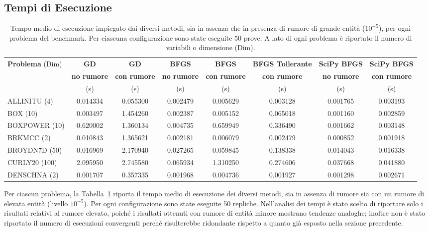 \subsection{Tempi di Esecuzione}
\begin{table}
    \scriptsize
    \caption{Tempo medio di esecuzione impiegato dai diversi metodi, sia in assenza che in presenza di rumore di grande entità (\(10^{-5}\)), per ogni problema del benchmark. Per ciascuna configurazione sono state eseguite 50 prove. A lato di ogni problema è riportato il numero di variabili o dimensione (Dim).}\label{tab:tempi_rumore_grande}
    \centering
    \begin{tabular}{lccccccc}
    \toprule
    \multirow{2}{*}{\textbf{Problema} (Dim)} & \textbf{GD} & \textbf{GD} & \textbf{BFGS} & \textbf{BFGS} & \textbf{BFGS Tollerante} & \textbf{SciPy BFGS} & \textbf{SciPy BFGS} \\
                                       & \textbf{no rumore} & \textbf{con rumore} & \textbf{no rumore} & \textbf{con rumore} & \textbf{con rumore} & \textbf{no rumore} & \textbf{con rumore} \\
                                       & (s) & (s) & (s) & (s) & (s) & (s) & (s) \\
    \midrule
    ALLINITU (4)  & 0.014334 & 0.055300 & 0.002479 & 0.005629 & 0.003128 & 0.001765 & 0.003193 \\[1ex]
    BOX (10)      & 0.003497 & 1.454260 & 0.002387 & 0.005152 & 0.065018 & 0.001160 & 0.002859 \\[1ex]
    BOXPOWER (10) & 0.620002 & 1.360134 & 0.004735 & 0.659949 & 0.336490 & 0.001662 & 0.003148 \\[1ex]
    BRKMCC (2)    & 0.010843 & 1.365621 & 0.002181 & 0.006079 & 0.002479 & 0.000852 & 0.001918 \\[1ex]
    BROYDN7D (50) & 0.016969 & 2.170940 & 0.027265 & 0.059845 & 0.138338 & 0.014043 & 0.016338 \\[1ex]
    CURLY20 (100) & 2.095950 & 2.745580 & 0.065934 & 1.310250 & 0.274606 & 0.037668 & 0.041880 \\[1ex]
    DENSCHNA (2)  & 0.001707 & 0.357335 & 0.001968 & 0.004736 & 0.001927 & 0.001298 & 0.002671 \\
    \bottomrule
    \end{tabular}
    
\end{table}
Per ciascun problema, la Tabella~\ref{tab:tempi_rumore_grande} riporta il tempo medio di esecuzione dei diversi metodi, sia in assenza di rumore sia con un rumore di elevata entità (livello \(10^{-5}\)). Per ogni configurazione sono state eseguite 50 repliche. Nell’analisi dei tempi è stato scelto di riportare solo i risultati relativi al rumore elevato, poiché i risultati ottenuti con rumore di entità minore mostrano tendenze analoghe; inoltre non è stato riportato il numero di esecuzioni convergenti perché risulterebbe ridondante rispetto a quanto già esposto nella sezione precedente.

